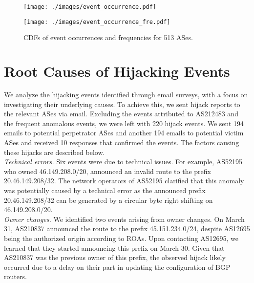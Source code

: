 \begin{figure}[b!]
  \centering
  \begin{minipage}[b]{0.43\linewidth}
    \centering
    \texttt{[image: ./images/event\_occurrence.pdf]}
  \end{minipage}
  \hfill
  \begin{minipage}[b]{0.43\linewidth}
    \centering
    \texttt{[image: ./images/event\_occurrence\_fre.pdf]}
  \end{minipage}
  \vspace{-10pt}
  \caption{\small CDFs of event occurrences and frequencies for 513 ASes.}
  \label{fig:hijacks_occur_fre_cdf}
\end{figure}

\section{Root Causes of Hijacking Events} \label{app:root_cause_hijack}
We analyze the hijacking events identified through email surveys, with a focus on investigating their underlying causes.
To achieve this, we sent hijack reports to the relevant ASes via email.
Excluding the events attributed to AS212483 and the frequent anomalous events, we were left with 220 hijack events. We sent 194 emails to potential perpetrator ASes and another 194 emails to potential victim ASes and received 10 responses that confirmed the events.
The factors causing these hijacks are described below. \\

 \noindent\textit{Technical errors.} Six events were due to technical issues. For example, AS52195 who owned 46.149.208.0/20, announced an invalid route to the prefix 20.46.149.208/32. The network operators of AS52195 clarified that this anomaly was potentially caused by a technical error as the announced prefix 20.46.149.208/32 can be generated by a circular byte right shifting on 46.149.208.0/20. \\
 
\noindent\textit{Owner changes.}
We identified two events arising from owner changes. On March 31, AS210837 announced the route to the prefix 45.151.234.0/24, despite AS12695 being the authorized origin according to ROAs. Upon contacting AS12695, we learned that they started announcing this prefix on March 30. Given that AS210837 was the previous owner of this prefix, the observed hijack likely occurred due to a delay on their part in updating the configuration of BGP routers.\\

